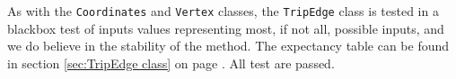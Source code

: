 As with the \texttt{Coordinates} and \texttt{Vertex} classes, the \texttt{TripEdge} class is tested in a blackbox test of inputs values representing most, if not all, possible inputs, and we do believe in the stability of the method. The expectancy table can be found in section \ref{sec:TripEdge class} on page \pageref{sec:TripEdge class}. All test are passed.